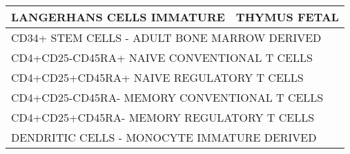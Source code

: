 \begin{table}[ht]
\begin{tabular}{|l|l|}
  LANGERHANS CELLS IMMATURE & THYMUS FETAL \\ 
  \hline
  \multicolumn{2}{|l|}{CD34+ STEM CELLS - ADULT BONE MARROW DERIVED} \\
  \multicolumn{2}{|l|}{CD4+CD25-CD45RA+ NAIVE CONVENTIONAL T CELLS} \\
  \multicolumn{2}{|l|}{CD4+CD25+CD45RA+ NAIVE REGULATORY T CELLS} \\
  \multicolumn{2}{|l|}{CD4+CD25-CD45RA- MEMORY CONVENTIONAL T CELLS} \\
  \multicolumn{2}{|l|}{CD4+CD25+CD45RA- MEMORY REGULATORY T CELLS} \\
  \multicolumn{2}{|l|}{DENDRITIC CELLS - MONOCYTE IMMATURE DERIVED} \\ 
  \hline
\end{tabular}
\end{table}

